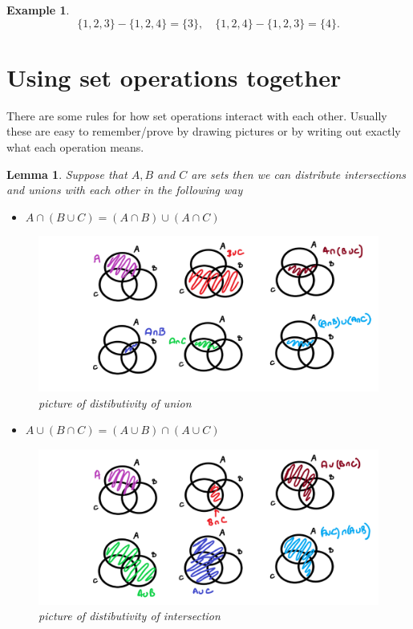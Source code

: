 \documentclass[
]{book}
\providecommand{\tightlist}{%
  \setlength{\itemsep}{0pt}\setlength{\parskip}{0pt}}
\newtheorem{lemma}{Lemma}[chapter]
\theoremstyle{definition}
\theoremstyle{definition}
\newtheorem{example}{Example}[chapter]
\theoremstyle{definition}
\theoremstyle{definition}
\theoremstyle{remark}
\begin{document}
\begin{example}
\[ \{1,2,3\} - \{1,2,4\} = \{3\}, \quad \{1,2,4\} - \{1,2,3\} = \{4\}.\]
\end{example}

\section{Using set operations together}\label{using-set-operations-together}

There are some rules for how set operations interact with each other. Usually these are easy to remember/prove by drawing pictures or by writing out exactly what each operation means.

\begin{lemma}

Suppose that \(A, B\) and \(C\) are sets then we can distribute intersections and unions with each other in the following way

\begin{itemize}
\tightlist
\item
  \(A \cap (B \cup C) = (A \cap B) \cup (A \cap C)\)
\end{itemize}

\begin{figure}
\centering
\includegraphics{distributive1.png}
\caption{\label{fig:unnamed-chunk-13}picture of distibutivity of union}
\end{figure}

\begin{itemize}
\tightlist
\item
  \(A\cup (B \cap C) = (A \cup B) \cap (A \cup C)\)
\end{itemize}

\begin{figure}
\centering
\includegraphics{distributive2.png}
\caption{\label{fig:unnamed-chunk-14}picture of distibutivity of intersection}
\end{figure}

\end{lemma}
\end{document}
